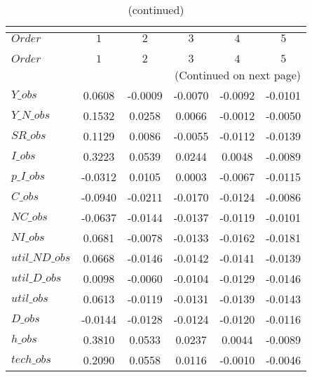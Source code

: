  
\begin{center}
\begin{longtable}{lccccc} 
\caption{COEFFICIENTS OF AUTOCORRELATION}\\
 \label{Table:th_autocorr_matrix}\\
\toprule 
$Order          $	 & 	 $          1$	 & 	 $          2$	 & 	 $          3$	 & 	 $          4$	 & 	 $          5$\\
\midrule \endfirsthead 
\caption{(continued)}\\
 \toprule \\ 
$Order          $	 & 	 $          1$	 & 	 $          2$	 & 	 $          3$	 & 	 $          4$	 & 	 $          5$\\
\midrule \endhead 
\midrule \multicolumn{6}{r}{(Continued on next page)} \\ \bottomrule \endfoot 
\bottomrule \endlastfoot 
$Y\_obs         $	 & 	     0.0608	 & 	    -0.0009	 & 	    -0.0070	 & 	    -0.0092	 & 	    -0.0101 \\ 
$Y\_N\_obs      $	 & 	     0.1532	 & 	     0.0258	 & 	     0.0066	 & 	    -0.0012	 & 	    -0.0050 \\ 
$SR\_obs        $	 & 	     0.1129	 & 	     0.0086	 & 	    -0.0055	 & 	    -0.0112	 & 	    -0.0139 \\ 
$I\_obs         $	 & 	     0.3223	 & 	     0.0539	 & 	     0.0244	 & 	     0.0048	 & 	    -0.0089 \\ 
$p\_I\_obs      $	 & 	    -0.0312	 & 	     0.0105	 & 	     0.0003	 & 	    -0.0067	 & 	    -0.0115 \\ 
$C\_obs         $	 & 	    -0.0940	 & 	    -0.0211	 & 	    -0.0170	 & 	    -0.0124	 & 	    -0.0086 \\ 
$NC\_obs        $	 & 	    -0.0637	 & 	    -0.0144	 & 	    -0.0137	 & 	    -0.0119	 & 	    -0.0101 \\ 
$NI\_obs        $	 & 	     0.0681	 & 	    -0.0078	 & 	    -0.0133	 & 	    -0.0162	 & 	    -0.0181 \\ 
$util\_ND\_obs  $	 & 	     0.0668	 & 	    -0.0146	 & 	    -0.0142	 & 	    -0.0141	 & 	    -0.0139 \\ 
$util\_D\_obs   $	 & 	     0.0098	 & 	    -0.0060	 & 	    -0.0104	 & 	    -0.0129	 & 	    -0.0146 \\ 
$util\_obs      $	 & 	     0.0613	 & 	    -0.0119	 & 	    -0.0131	 & 	    -0.0139	 & 	    -0.0143 \\ 
$D\_obs         $	 & 	    -0.0144	 & 	    -0.0128	 & 	    -0.0124	 & 	    -0.0120	 & 	    -0.0116 \\ 
$h\_obs         $	 & 	     0.3810	 & 	     0.0533	 & 	     0.0237	 & 	     0.0044	 & 	    -0.0089 \\ 
$tech\_obs      $	 & 	     0.2090	 & 	     0.0558	 & 	     0.0116	 & 	    -0.0010	 & 	    -0.0046 \\ 
\end{longtable}
 \end{center}

